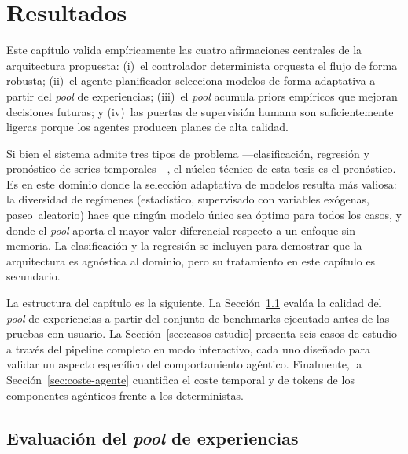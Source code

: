 
\section{Resultados}
\label{sec:resultados}

Este capítulo valida empíricamente las cuatro afirmaciones centrales de la
arquitectura propuesta: (i)~el controlador determinista orquesta el flujo de forma
robusta; (ii)~el agente planificador selecciona modelos de forma adaptativa a partir
del \textit{pool} de experiencias; (iii)~el \textit{pool} acumula priors empíricos
que mejoran decisiones futuras; y (iv)~las puertas de supervisión humana son
suficientemente ligeras porque los agentes producen planes de alta calidad.

Si bien el sistema admite tres tipos de problema —clasificación, regresión y
pronóstico de series temporales—, el núcleo técnico de esta tesis es el pronóstico.
Es en este dominio donde la selección adaptativa de modelos resulta más valiosa: la
diversidad de regímenes (estadístico, supervisado con variables exógenas,
paseo~aleatorio) hace que ningún modelo único sea óptimo para todos los casos, y donde el
\textit{pool} aporta el mayor valor diferencial respecto a un enfoque sin memoria.
La clasificación y la regresión se incluyen para demostrar que la arquitectura es
agnóstica al dominio, pero su tratamiento en este capítulo es secundario.

La estructura del capítulo es la siguiente.
La Sección~\ref{sec:pool-evaluacion} evalúa la calidad del \textit{pool} de
experiencias a partir del conjunto de benchmarks ejecutado antes de las pruebas con
usuario.
La Sección~\ref{sec:casos-estudio} presenta seis casos de estudio a través del
pipeline completo en modo interactivo, cada uno diseñado para validar un aspecto
específico del comportamiento agéntico.
Finalmente, la Sección~\ref{sec:coste-agente} cuantifica el coste temporal y de
tokens de los componentes agénticos frente a los deterministas.

\subsection{Evaluación del \textit{pool} de experiencias}
\label{sec:pool-evaluacion}

